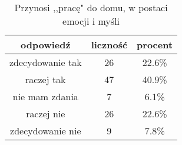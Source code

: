 \begin{table}[H]
\caption{Przynosi ,,pracę" do domu, w postaci emocji i myśli}
\centering
\begin{tabular}{ | c | c | c |}
\hline
odpowiedź & liczność & procent\\
\hline
zdecydowanie tak  &  26  & 22.6\% \\
\hline
raczej tak  &  47  & 40.9\% \\
\hline
nie mam zdania  &  7  & 6.1\% \\
\hline
raczej nie  &  26  & 22.6\% \\
\hline
zdecydowanie nie  &  9  & 7.8\% \\
\hline
\end{tabular}
\label{tab:Q10}
\end{table}


